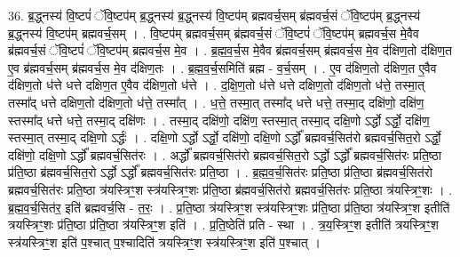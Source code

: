 \documentclass[17pt]{extarticle}
\begin{document}
36. ब्र॒द्ध्नस्य॑ वि॒ष्टपं॑ ॅवि॒ष्टप॑म् ब्र॒द्ध्नस्य॑ ब्र॒द्ध्नस्य॑ वि॒ष्टप॑म् ब्रह्मवर्च॒सम् ब्र॑ह्मवर्च॒सं ॅवि॒ष्टप॑म् ब्र॒द्ध्नस्य॑ ब्र॒द्ध्नस्य॑ वि॒ष्टप॑म् ब्रह्मवर्च॒सम् । . वि॒ष्टप॑म् ब्रह्मवर्च॒सम् ब्र॑ह्मवर्च॒सं ॅवि॒ष्टपं॑ ॅवि॒ष्टप॑म् ब्रह्मवर्च॒स मे॒वैव ब्र॑ह्मवर्च॒सं ॅवि॒ष्टपं॑ ॅवि॒ष्टप॑म् ब्रह्मवर्च॒स मे॒व । . ब्र॒ह्म॒व॒र्च॒स मे॒वैव ब्र॑ह्मवर्च॒सम् ब्र॑ह्मवर्च॒स मे॒व द॑क्षिण॒तो द॑क्षिण॒त ए॒व ब्र॑ह्मवर्च॒सम् ब्र॑ह्मवर्च॒स मे॒व द॑क्षिण॒तः । . ब्र॒ह्म॒व॒र्च॒समिति॑ ब्रह्म - व॒र्च॒सम् । . ए॒व द॑क्षिण॒तो द॑क्षिण॒त ए॒वैव द॑क्षिण॒तो ध॑त्ते धत्ते दक्षिण॒त ए॒वैव द॑क्षिण॒तो ध॑त्ते । . द॒क्षि॒ण॒तो ध॑त्ते धत्ते दक्षिण॒तो द॑क्षिण॒तो ध॑त्ते॒ तस्मा॒त् तस्मा᳚द् धत्ते दक्षिण॒तो द॑क्षिण॒तो ध॑त्ते॒ तस्मा᳚त् । . ध॒त्ते॒ तस्मा॒त् तस्मा᳚द् धत्ते धत्ते॒ तस्मा॒द् दक्षि॑णो॒ दक्षि॑ण॒ स्तस्मा᳚द् धत्ते धत्ते॒ तस्मा॒द् दक्षि॑णः । . तस्मा॒द् दक्षि॑णो॒ दक्षि॑ण॒ स्तस्मा॒त् तस्मा॒द् दक्षि॒णो ऽर्द्धो ऽर्द्धो॒ दक्षि॑ण॒ स्तस्मा॒त् तस्मा॒द् दक्षि॒णो ऽर्द्धः॑ । . दक्षि॒णो ऽर्द्धो ऽर्द्धो॒ दक्षि॑णो॒ दक्षि॒णो ऽर्द्धो᳚ ब्रह्मवर्च॒सित॑रो ब्रह्मवर्च॒सित॒रो ऽर्द्धो॒ दक्षि॑णो॒ दक्षि॒णो ऽर्द्धो᳚ ब्रह्मवर्च॒सित॑रः । . अर्द्धो᳚ ब्रह्मवर्च॒सित॑रो ब्रह्मवर्च॒सित॒रो ऽर्द्धो ऽर्द्धो᳚ ब्रह्मवर्च॒सित॑रः प्रति॒ष्ठा प्र॑ति॒ष्ठा ब्र॑ह्मवर्च॒सित॒रो ऽर्द्धो ऽर्द्धो᳚ ब्रह्मवर्च॒सित॑रः प्रति॒ष्ठा । . ब्र॒ह्म॒व॒र्च॒सित॑रः प्रति॒ष्ठा प्र॑ति॒ष्ठा ब्र॑ह्मवर्च॒सित॑रो ब्रह्मवर्च॒सित॑रः प्रति॒ष्ठा त्र॑यस्त्रिꣳ॒॒श स्त्र॑यस्त्रिꣳ॒॒शः प्र॑ति॒ष्ठा ब्र॑ह्मवर्च॒सित॑रो ब्रह्मवर्च॒सित॑रः प्रति॒ष्ठा त्र॑यस्त्रिꣳ॒॒शः । . ब्र॒ह्म॒व॒र्च॒सित॑र॒ इति॑ ब्रह्मवर्च॒सि - त॒रः॒ । . प्र॒ति॒ष्ठा त्र॑यस्त्रिꣳ॒॒श स्त्र॑यस्त्रिꣳ॒॒शः प्र॑ति॒ष्ठा प्र॑ति॒ष्ठा त्र॑यस्त्रिꣳ॒॒श इतीति॑ त्रयस्त्रिꣳ॒॒शः प्र॑ति॒ष्ठा प्र॑ति॒ष्ठा त्र॑यस्त्रिꣳ॒॒श इति॑ । . प्र॒ति॒ष्ठेति॑ प्रति - स्था । . त्र॒य॒स्त्रिꣳ॒॒श इतीति॑ त्रयस्त्रिꣳ॒॒श स्त्र॑यस्त्रिꣳ॒॒श इति॑ प॒श्चात् प॒श्चादिति॑ त्रयस्त्रिꣳ॒॒श स्त्र॑यस्त्रिꣳ॒॒श इति॑ प॒श्चात् । \newline
\end{document}
